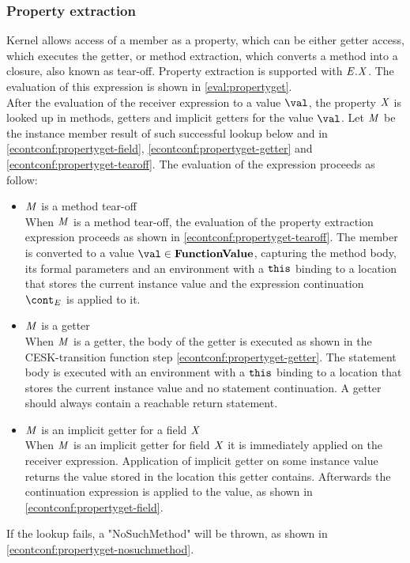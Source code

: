 \documentclass{article}
\begin{document}
\subsubsection{Property extraction}
\label{subsubsec:property-extraction}
Kernel allows access of a member as a property, which can be either getter access, which executes the getter, or method extraction, which converts a method into a closure, also known as tear-off.
Property extraction is supported with $\mathit{E}.\mathit{X}$.
The evaluation of this expression is shown in \eqref{eval:propertyget}.\\
\noindent
After the evaluation of the receiver expression to a value $\val$, the property $\mathit{X}$ is looked up in methods, getters and implicit getters for the value $\val$.
Let $\mathit{M}$ be the instance member result of such successful lookup below and in \eqref{econtconf:propertyget-field}, \eqref{econtconf:propertyget-getter} and \eqref{econtconf:propertyget-tearoff}.
The evaluation of the expression proceeds as follow:
\begin{itemize}
\item $\mathit{M}$ is a method tear-off\\
When $\mathit{M}$ is a method tear-off, the evaluation of the property extraction expression proceeds as shown in \eqref{econtconf:propertyget-tearoff}.
The member is converted to a value $\val \in \dfunval$, capturing the method body, its formal parameters and an environment with a $\tt{this}$ binding to a location that stores the current instance value and the expression continuation $\econt$ is applied to it.
\item $\mathit{M}$ is a getter\\
When $\mathit{M}$ is a getter, the body of the getter is executed as shown in the CESK-transition function step \eqref{econtconf:propertyget-getter}.
The statement body is executed with an environment with a $\tt{this}$ binding to a location that stores the current instance value and no statement continuation.
A getter should always contain a reachable return statement.
\item $\mathit{M}$ is an implicit getter for a field $\mathit{X}$\\
When $\mathit{M}$ is an implicit getter for field $\mathit{X}$ it is immediately applied on the receiver expression.
Application of implicit getter on some instance value returns the value stored in the location this getter contains.
Afterwards the continuation expression is applied to the value, as shown in \eqref{econtconf:propertyget-field}.
\end{itemize}
If the lookup fails, a "NoSuchMethod" will be thrown, as shown in \eqref{econtconf:propertyget-nosuchmethod}.
%
%
\end{document}
